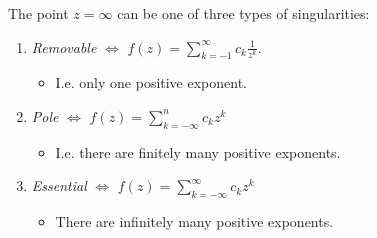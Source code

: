 The point \(z=\infty\) can be one of three types of singularities:

\begin{enumerate}
\def\labelenumi{\arabic{enumi}.}
\item
  \emph{Removable} \(\iff\)
  \(f(z) = \sum_{k=-1}^\infty c_k \frac{1}{z^k}\).

  \begin{itemize}
  \tightlist
  \item
    I.e. only one positive exponent.
  \end{itemize}
\item
  \emph{Pole} \(\iff\) \(f(z) = \sum_{k = -\infty}^n c_k z^k\)

  \begin{itemize}
  \tightlist
  \item
    I.e. there are finitely many positive exponents.
  \end{itemize}
\item
  \emph{Essential} \(\iff\) \(f(z) = \sum_{k=-\infty}^\infty c_k z^k\)

  \begin{itemize}
  \tightlist
  \item
    There are infinitely many positive exponents.
  \end{itemize}
\end{enumerate}

